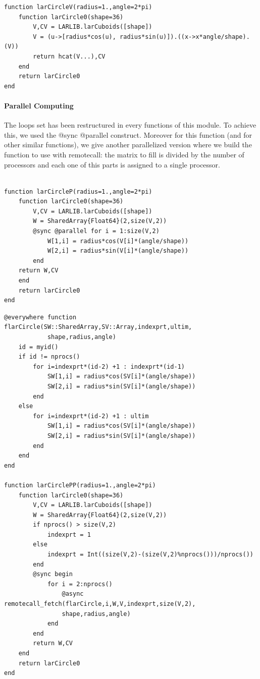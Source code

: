 \documentclass{article}
\begin{document}
\begin{Verbatim}
function larCircleV(radius=1.,angle=2*pi)
    function larCircle0(shape=36)
        V,CV = LARLIB.larCuboids([shape])
        V = (u->[radius*cos(u), radius*sin(u)]).((x->x*angle/shape).(V))
        return hcat(V...),CV
    end 
    return larCircle0   
end
\end{Verbatim}

\paragraph{Parallel Computing\\}
The loops set has been restructured in every functions of this module. To achieve this, we used the @sync @parallel construct.
Moreover for this function (and for other similar functions), we give another parallelized version where we build the function to use with remotecall: the matrix to fill is divided by the number of processors and each one of this parts is assigned to a single processor.

\begin{Verbatim}

function larCircleP(radius=1.,angle=2*pi)
    function larCircle0(shape=36)
        V,CV = LARLIB.larCuboids([shape])
        W = SharedArray{Float64}(2,size(V,2))
        @sync @parallel for i = 1:size(V,2)
            W[1,i] = radius*cos(V[i]*(angle/shape))             
            W[2,i] = radius*sin(V[i]*(angle/shape))
        end
    return W,CV
    end
    return larCircle0
end
\end{Verbatim}

\begin{Verbatim}
@everywhere function flarCircle(SW::SharedArray,SV::Array,indexprt,ultim,
            shape,radius,angle)
    id = myid()
    if id != nprocs()
        for i=indexprt*(id-2) +1 : indexprt*(id-1)
            SW[1,i] = radius*cos(SV[i]*(angle/shape))             
            SW[2,i] = radius*sin(SV[i]*(angle/shape))
        end
    else
        for i=indexprt*(id-2) +1 : ultim
            SW[1,i] = radius*cos(SV[i]*(angle/shape))             
            SW[2,i] = radius*sin(SV[i]*(angle/shape))
        end
    end
end

function larCirclePP(radius=1.,angle=2*pi) 
    function larCircle0(shape=36)
        V,CV = LARLIB.larCuboids([shape])
        W = SharedArray{Float64}(2,size(V,2))
        if nprocs() > size(V,2)
            indexprt = 1
        else
            indexprt = Int((size(V,2)-(size(V,2)%nprocs()))/nprocs())
        end
        @sync begin
            for i = 2:nprocs()
                @async remotecall_fetch(flarCircle,i,W,V,indexprt,size(V,2),
                shape,radius,angle)
            end
        end
        return W,CV 
    end
    return larCircle0 
end
\end{Verbatim}
\end{document}
